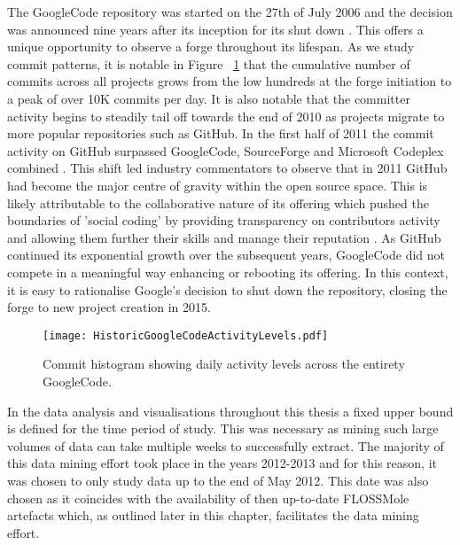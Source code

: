 The GoogleCode repository was started on the 27th of July 2006 \cite{shankland2006google} and the decision was announced nine years after its inception for its shut down \cite{dibona2006bidding}. This offers a unique opportunity to observe a forge throughout its lifespan. As we study commit patterns, it is notable in Figure ~\ref{fig:HistoricGoogleCodeActivityLevels} that the cumulative number of commits across all projects grows from the low hundreds at the forge initiation to a peak of over 10K commits per day. It is also notable that the committer activity begins to steadily tail off towards the end of 2010 as projects migrate to more popular repositories such as GitHub. In the first half of 2011 the commit activity on GitHub surpassed GoogleCode, SourceForge and Microsoft Codeplex combined \cite{redmonk2011}. This shift led industry commentators to observe that in 2011 GitHub had become the major centre of gravity within the open source space. This is likely attributable to the collaborative nature of its offering which pushed the boundaries of 'social coding' by providing transparency on contributors activity and allowing them further their skills and manage their reputation \cite{dabbish2012social}. As GitHub continued its exponential growth over the subsequent years, GoogleCode did not compete in a meaningful way enhancing or rebooting its offering. In this context, it is easy to rationalise Google's decision to shut down the repository, closing the forge to new project creation in 2015.
 
\begin{figure}[htbp!] 
\centering    
\texttt{[image: HistoricGoogleCodeActivityLevels.pdf]}
\caption{Commit histogram showing daily activity levels across the entirety GoogleCode.}
\label{fig:HistoricGoogleCodeActivityLevels}
\end{figure}

In the data analysis and visualisations throughout this thesis a fixed upper bound is defined for the time period of study. This was necessary as mining such large volumes of data can take multiple weeks to successfully extract. The majority of this data mining effort took place in the years 2012-2013 and for this reason, it was chosen to only study data up to the end of May 2012. This date was also chosen as it coincides with the availability of then up-to-date FLOSSMole artefacts which, as outlined later in this chapter, facilitates the data mining effort.  

